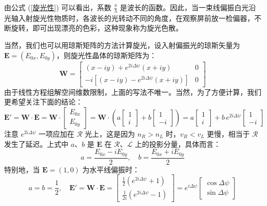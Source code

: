 \documentclass[UTF8]{report}
\theoremstyle{MyLineTheoremStyle} %
\theoremstyle{MyBlockTheoremStyle} %
\theoremstyle{MySubsubsectionStyle} %
\begin{document}
由公式 (\ref{旋光性}) 可以看出，系数 $\frac{\pi}{\lambda}$ 是波长的函数。因此，当一束线偏振白光沿光轴入射旋光性物质时，各波长的光转动不同的角度，在观察屏前放一检偏器，不断旋转，即可出现漂亮的色彩，这种现象称为旋光色散。

当然，我们也可以用琼斯矩阵的方法计算旋光，设入射偏振光的琼斯矢量为 $\boldsymbol{E} = (E_{0x}, E_{0y})$，则旋光性晶体的琼斯矩阵为：
\begin{equation}
\boldsymbol{W} = 
\begin{bmatrix}
    (x - iy) + e^{2 i \Delta \psi} (x + iy)  & 0\\ 
    -i \left[ (x - iy) - e^{2 i \Delta \psi} (x + iy) \right] & 0
\end{bmatrix}
\end{equation}
由于线性方程组解空间维数限制，上面的写法不唯一。当然，为了方便计算，我们更希望关注下面的结论：
\begin{equation}
    \boldsymbol{E'} = 
    \boldsymbol{W}\cdot\boldsymbol{E} = 
    \boldsymbol{W}\cdot \begin{bmatrix}
        E_{0x} \\
        E_{0y}
    \end{bmatrix}
    = 
    \boldsymbol{W} \cdot\left( a \begin{bmatrix}
        1 \\
        i
    \end{bmatrix} + 
    b \begin{bmatrix}
        1 \\
        -i
    \end{bmatrix} 
    \right)
    = 
    a \begin{bmatrix}
        1 \\
        i
    \end{bmatrix} +
    b \, e^{2 i \Delta \psi}\begin{bmatrix}
        1 \\
        -i
    \end{bmatrix}
\end{equation}
注意 $e^{2 i \Delta \psi}$ 一项应加在 $\mathscr{R}$ 光上，这是因为 $n_R > n_L$ 时，$v_R < v_L$ 更慢，相当于 $\mathscr{R}$ 发生了延迟。上式中 $a$、$b$ 是 $\boldsymbol{E}$ 在 $\mathscr{R}$、$\mathscr{L}$ 上的投影分量，具体而言：
\begin{equation}
a = \frac{E_{0x} - i E_{0y}}{2},\quad b = \frac{E_{0x} + i E_{0y}}{2}
\end{equation}
特别地，当 $\boldsymbol{E} = (1, 0)$ 为水平线偏振时：
\begin{equation}
a = b = \frac{1}{2},\quad \boldsymbol{E'} = \boldsymbol{W}\cdot \boldsymbol{E} = 
\begin{bmatrix}
    \frac{1}{2}\left(e^{2 i \Delta \psi} + 1\right) \\
    \frac{1}{2i}(e^{2 i \Delta \psi} - 1)
\end{bmatrix}
=
e^{i \Delta \psi}
\begin{bmatrix}
    \cos \Delta \psi \\
    \sin \Delta \psi
\end{bmatrix}
\end{equation}
\end{document}
